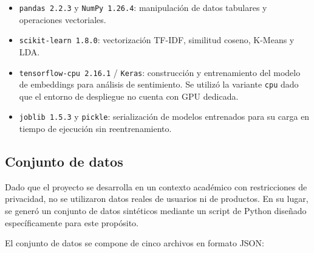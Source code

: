 \documentclass[11pt, letterpaper]{article}
\begin{document}
	\begin{itemize}
		\item \texttt{pandas 2.2.3} y \texttt{NumPy 1.26.4}: manipulación de
		datos tabulares y operaciones vectoriales.
		\item \texttt{scikit-learn 1.8.0}: vectorización TF-IDF, similitud coseno,
		K-Means y LDA.
		\item \texttt{tensorflow-cpu 2.16.1} / \texttt{Keras}: construcción y
		entrenamiento del modelo de embeddings para análisis de sentimiento. Se
		utilizó la variante \texttt{cpu} dado que el entorno de despliegue no
		cuenta con GPU dedicada.
		\item \texttt{joblib 1.5.3} y \texttt{pickle}: serialización de modelos
		entrenados para su carga en tiempo de ejecución sin reentrenamiento.
	\end{itemize}
	
	\subsection{Conjunto de datos}
	
	Dado que el proyecto se desarrolla en un contexto académico con restricciones
	de privacidad, no se utilizaron datos reales de usuarios ni de productos. En
	su lugar, se generó un conjunto de datos sintéticos mediante un script de
	Python diseñado específicamente para este propósito.
	
	El conjunto de datos se compone de cinco archivos en formato JSON:
	
\end{document}
